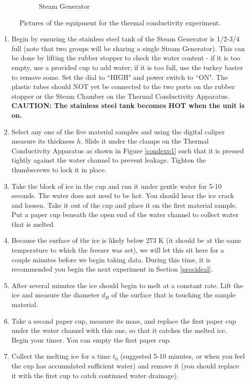 \begin{figure}
\begin{subfigure}{0.48\textwidth}
		\caption{Steam Generator}
		\label{condexp2}
\end{subfigure}
\caption{Pictures of the equipment for the thermal conductivity experiment.}
\label{condexp}
\end{figure}

\begin{enumerate}
	\item Begin by ensuring the stainless steel tank of the Steam Generator is 1/2-3/4 full (note that two groups will be sharing a single Steam Generator).  This can be done by lifting the rubber stopper to check the water content - if it is too empty, use a provided cup to add water; if it is too full, use the turkey baster to remove some.  Set the dial to ``HIGH" and power switch to ``ON".  The plastic tubes should NOT yet be connected to the two ports on the rubber stopper or the Steam Chamber on the Thermal Conductivity Apparatus.  \textbf{CAUTION: The stainless steel tank becomes HOT when the unit is on.}
	\item Select any one of the five material samples and using the digital caliper measure its thickness $h$.  Slide it under the clamps on the Thermal Conductivity Apparatus as shown in Figure \ref{condexp1} such that it is pressed tightly against the water channel to prevent leakage.  Tighten the thumbscrews to lock it in place.
	\item Take the block of ice in the cup and run it under gentle water for 5-10 seconds.  The water does not need to be hot.  You should hear the ice crack and loosen.  Take it out of the cup and place it on the first material sample.  Put a paper cup beneath the open end of the water channel to collect water that is melted.
	\item Because the surface of the ice is likely below $273$ K (it should be at the same temperature to which the freezer was set), we will let this sit here for a couple minutes before we begin taking data.  During this time, it is recommended you begin the next experiment in Section \ref{procideal}.
	\item After several minutes the ice should begin to melt at a constant rate.  Lift the ice and measure the diameter $d_B$ of the surface that is touching the sample material.
	\item Take a second paper cup, measure its mass, and replace the first paper cup under the water channel with this one, so that it catches the melted ice.  Begin your timer.  You can empty the first paper cup.
	\item Collect the melting ice for a time $t_{0}$ (suggested 5-10 minutes, or when you feel the cup has accumulated sufficient water) and remove it (you should replace it with the first cup to catch continued water drainage).

\end{enumerate}
